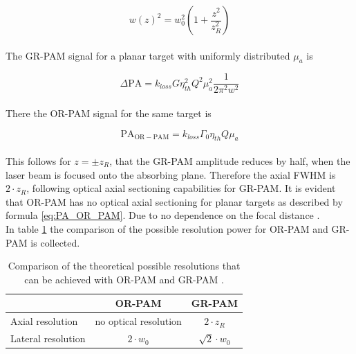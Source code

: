 \begin{equation}
w(z)^2 =  w_0^2 \left(1 + \frac{z^2}{z_R^2}\right)
\end{equation}
\\
The GR-PAM signal for a planar target with uniformly distributed $\mu_a$ is 

\begin{equation}
\Delta \mathrm{PA} = k_{loss} G \eta_{th}^2 Q^2 \mu_a^2 \frac{1}{2 \pi^2w^2} 
\end{equation}
\\
There the OR-PAM signal for the same target is

\begin{equation}
\mathrm{PA_{OR-PAM}} = k_{loss} \Gamma_0 \eta_{th} Q \mu_a 
\label{eq:PA_OR_PAM}
\end{equation}
\\
This follows for $z = \pm z_R$, that the GR-PAM amplitude reduces by half, when the laser beam is focused onto the absorbing plane. Therefore the axial FWHM is $2\cdot z_R$, following optical axial sectioning capabilities for GR-PAM. It is evident that OR-PAM has no optical axial sectioning for planar targets as described by formula \ref{eq:PA_OR_PAM}. Due to no dependence on the focal distance \cite{PhysRevLett.113.174301}.\\
In table \ref{tab:resCompare} the comparison of the possible resolution power for OR-PAM and GR-PAM is collected.

\begin{table}[H]
	\centering
	\caption{Comparison of the theoretical possible resolutions that can be achieved with OR-PAM and GR-PAM \cite{Wang:GRPAM}.}
	\begin{tabular}{| m{1.7cm} | c | c |}
		\hline
		&OR-PAM&GR-PAM \\ \hline
		\centering Axial \newline resolution&no optical resolution&$2\cdot z_R$ \\ \hline
		\centering Lateral \newline resolution&$2 \cdot w_0$&$\sqrt{2} \cdot w_0$\\	\hline
	\end{tabular}	 
	\label{tab:resCompare}
\end{table}



